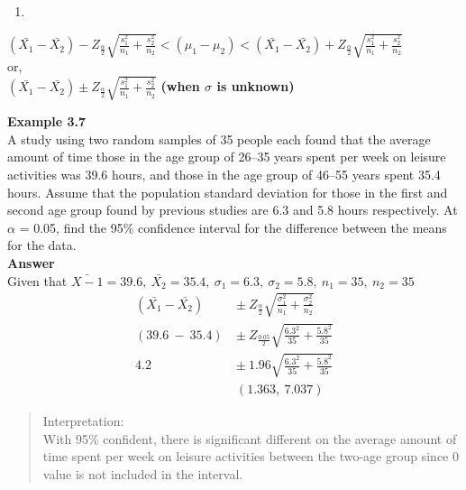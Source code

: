 \documentclass[
  a4paper,
  DIV=11,
  numbers=noendperiod,
  oneside]{scrreprt}
\providecommand{\tightlist}{%
  \setlength{\itemsep}{0pt}\setlength{\parskip}{0pt}}\usepackage{longtable,booktabs,array}
\begin{document}
\begin{enumerate}
\def\labelenumi{\roman{enumi})}
\setcounter{enumi}{1}
\tightlist
\item
\end{enumerate}

\((\bar{X_1}-\bar{X_2})-Z_{\frac{\alpha}{2}}{\sqrt{\frac{s_1^2}{n_1}+\frac{s_2^2}{n_2}}}\lt(\mu_1-\mu_2)\lt(\bar{X_1}-\bar{X_2})+Z_{\frac{\alpha}{2}}{\sqrt{\frac{s_1^2}{n_1}+\frac{s_2^2}{n_2}}}\)\\
or,\\
\((\bar{X_1}-\bar{X_2})\pm Z_{\frac{\alpha}{2}}{\sqrt{\frac{s_1^2}{n_1}+\frac{s_2^2}{n_2}}}\)
\textbf{(when \(\sigma\) is unknown)}

{\textbf{Example 3.7}}\\

A study using two random samples of 35 people each found that the
average amount of time those in the age group of 26--35 years spent per
week on leisure activities was 39.6 hours, and those in the age group of
46--55 years spent 35.4 hours. Assume that the population standard
deviation for those in the first and second age group found by previous
studies are 6.3 and 5.8 hours respectively. At \(\alpha\) = 0.05, find
the 95\% confidence interval for the difference between the means for
the data.\\

{\textbf{Answer}}\\

Given that
\(\bar{X-1}=39.6,\ \bar{X_2}=35.4,\ \sigma_1=6.3,\ \sigma_2=5.8,\ n_1=35,\ n_2=35\)\\

\[
\begin{aligned}
(\bar{X_1}-\bar{X_2})\ &\pm\ Z_{\frac{\alpha}{2}}{\sqrt{\frac{\sigma_1^2}{n_1}+\frac{\sigma_2^2}{n_2}}} \\
(39.6\ -\ 35.4)\ &\pm\ Z_{\frac{0.05}{2}}{\sqrt{\frac{6.3^2}{35}+\frac{5.8^2}{35}}} \\
4.2\ &\pm\ 1.96{\sqrt{\frac{6.3^2}{35}+\frac{5.8^2}{35}}} \\
&(1.363,\ 7.037)
\end{aligned}
\]

\begin{quote}
Interpretation:\\
With 95\% confident, there is significant different on the average
amount of time spent per week on leisure activities between the two-age
group since 0 value is not included in the interval.
\end{quote}
\end{document}
